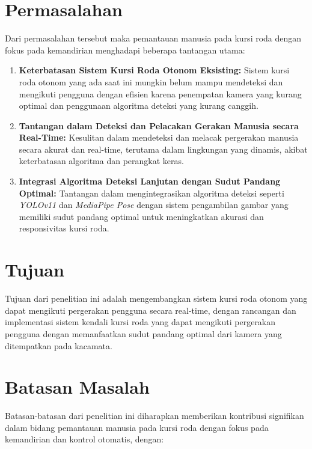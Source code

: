 \section{Permasalahan}
\label{sec:permasalahan}

Dari permasalahan tersebut maka pemantauan manusia pada kursi roda dengan fokus pada kemandirian menghadapi beberapa tantangan utama:

\begin{enumerate}[nolistsep]
      \item \textbf{Keterbatasan Sistem Kursi Roda Otonom Eksisting:} Sistem kursi roda otonom yang ada saat ini mungkin belum mampu mendeteksi dan mengikuti pengguna dengan efisien karena penempatan kamera yang kurang optimal dan penggunaan algoritma deteksi yang kurang canggih.
      \item \textbf{Tantangan dalam Deteksi dan Pelacakan Gerakan Manusia secara Real-Time:} Kesulitan dalam mendeteksi dan melacak pergerakan manusia secara akurat dan real-time, terutama dalam lingkungan yang dinamis, akibat keterbatasan algoritma dan perangkat keras.
      \item \textbf{Integrasi Algoritma Deteksi Lanjutan dengan Sudut Pandang Optimal:} Tantangan dalam mengintegrasikan algoritma deteksi seperti \emph{YOLOv11} dan \emph{MediaPipe Pose} dengan sistem pengambilan gambar yang memiliki sudut pandang optimal untuk meningkatkan akurasi dan responsivitas kursi roda.
\end{enumerate}

\section{Tujuan}
\label{sec:Tujuan}

Tujuan dari penelitian ini adalah mengembangkan sistem kursi roda otonom yang dapat mengikuti pergerakan pengguna secara real-time, dengan rancangan dan implementasi sistem kendali kursi roda yang dapat mengikuti pergerakan pengguna dengan memanfaatkan sudut pandang optimal dari kamera yang ditempatkan pada kacamata.

\section{Batasan Masalah}
\label{sec:batasanmasalah}

Batasan-batasan dari penelitian ini diharapkan memberikan kontribusi signifikan dalam bidang pemantauan manusia pada kursi roda dengan fokus pada kemandirian dan kontrol otomatis, dengan:

